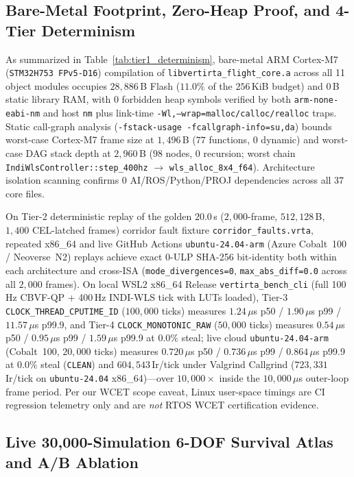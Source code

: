 \documentclass[conference,10pt]{IEEEtran}
\begin{document}
\subsection{Bare-Metal Footprint, Zero-Heap Proof, and 4-Tier Determinism}

As summarized in Table~\ref{tab:tier1_determinism}, bare-metal ARM Cortex-M7 (\texttt{STM32H753 FPv5-D16}) compilation of \texttt{libvertirta\_flight\_core.a} across all 11 object modules occupies $28{,}886$\,B Flash ($11.0\%$ of the $256$\,KiB budget) and $0$\,B static library RAM, with $0$ forbidden heap symbols verified by both \texttt{arm-none-eabi-nm} and host \texttt{nm} plus link-time \texttt{-Wl,--wrap=malloc/calloc/realloc} traps. Static call-graph analysis (\texttt{-fstack-usage -fcallgraph-info=su,da}) bounds worst-case Cortex-M7 frame size at $1{,}496$\,B ($77$ functions, $0$ dynamic) and worst-case DAG stack depth at $2{,}960$\,B ($98$ nodes, $0$ recursion; worst chain \texttt{IndiWlsController::step\_400hz} $\to$ \texttt{wls\_alloc\_8x4\_f64}). Architecture isolation scanning confirms $0$ AI/ROS/Python/PROJ dependencies across all $37$ core files.

On Tier-2 deterministic replay of the golden $20.0$\,s ($2{,}000$-frame, $512{,}128$\,B, $1{,}400$ CEL-latched frames) corridor fault fixture \texttt{corridor\_faults.vrta}, repeated x86\_64 and live GitHub Actions \texttt{ubuntu-24.04-arm} (Azure Cobalt~100 / Neoverse~N2) replays achieve exact 0-ULP SHA-256 bit-identity both within each architecture and cross-ISA (\texttt{mode\_divergences=0}, \texttt{max\_abs\_diff=0.0} across all $2{,}000$ frames). On local WSL2 x86\_64 Release \texttt{vertirta\_bench\_cli} (full 100\,Hz CBVF-QP + 400\,Hz INDI-WLS tick with LUTs loaded), Tier-3 \texttt{CLOCK\_THREAD\_CPUTIME\_ID} ($100{,}000$ ticks) measures $1.24\,\mu$s p50 / $1.90\,\mu$s p99 / $11.57\,\mu$s p99.9, and Tier-4 \texttt{CLOCK\_MONOTONIC\_RAW} ($50{,}000$ ticks) measures $0.54\,\mu$s p50 / $0.95\,\mu$s p99 / $1.59\,\mu$s p99.9 at $0.0\%$ steal; live cloud \texttt{ubuntu-24.04-arm} (Cobalt~100, $20{,}000$ ticks) measures $0.720\,\mu$s p50 / $0.736\,\mu$s p99 / $0.864\,\mu$s p99.9 at $0.0\%$ steal (\texttt{CLEAN}) and $604{,}543$\,Ir/tick under Valgrind Callgrind ($723{,}331$\,Ir/tick on \texttt{ubuntu-24.04} x86\_64)---over $10{,}000\times$ inside the $10{,}000\,\mu$s outer-loop frame period. Per our WCET scope caveat, Linux user-space timings are CI regression telemetry only and are \emph{not} RTOS WCET certification evidence.

\subsection{Live 30{,}000-Simulation 6-DOF Survival Atlas and A/B Ablation}
\end{document}

